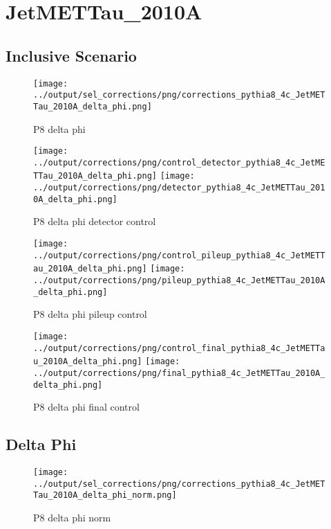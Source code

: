 \documentclass[11pt]{book}
\begin{document}
\clearpage

\section{JetMETTau\_2010A}

\subsection{Inclusive Scenario}
\begin{figure}[ht]
\centering
\texttt{[image: ../output/sel\_corrections/png/corrections\_pythia8\_4c\_JetMETTau\_2010A\_delta\_phi.png]}
\caption{P8 delta phi}
\label{fig:p8_JetMETTau_2010A_delta_phi}
\end{figure}

\begin{figure}[ht]
\centering
\texttt{[image: ../output/corrections/png/control\_detector\_pythia8\_4c\_JetMETTau\_2010A\_delta\_phi.png]}
\texttt{[image: ../output/corrections/png/detector\_pythia8\_4c\_JetMETTau\_2010A\_delta\_phi.png]}
\caption{P8 delta phi detector control}
\label{fig:p8_JetMETTau_2010A_delta_phi_detector_control}
\end{figure}

\begin{figure}[ht]
\centering
\texttt{[image: ../output/corrections/png/control\_pileup\_pythia8\_4c\_JetMETTau\_2010A\_delta\_phi.png]}
\texttt{[image: ../output/corrections/png/pileup\_pythia8\_4c\_JetMETTau\_2010A\_delta\_phi.png]}
\caption{P8 delta phi pileup control}
\label{fig:p8_JetMETTau_2010A_delta_phi_pileup_control}
\end{figure}


\begin{figure}[ht]
\centering
\texttt{[image: ../output/corrections/png/control\_final\_pythia8\_4c\_JetMETTau\_2010A\_delta\_phi.png]}
\texttt{[image: ../output/corrections/png/final\_pythia8\_4c\_JetMETTau\_2010A\_delta\_phi.png]}
\caption{P8 delta phi final control}
\label{fig:p8_JetMETTau_2010A_delta_phi_final_control}
\end{figure}

\subsection{Delta Phi}
\begin{figure}[ht]
\centering
\texttt{[image: ../output/sel\_corrections/png/corrections\_pythia8\_4c\_JetMETTau\_2010A\_delta\_phi\_norm.png]}
\caption{P8 delta phi norm}
\label{fig:p8_JetMETTau_2010A_delta_phi_norm}
\end{figure}
\end{document}
